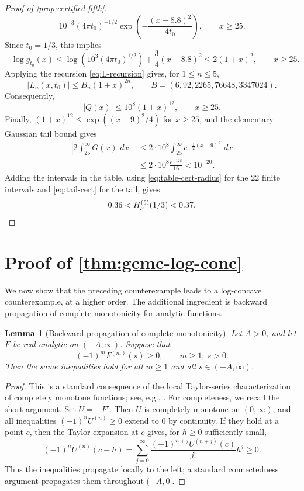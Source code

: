 \documentclass[11pt]{article}
\newtheorem{lemma}{Lemma}
\newcommand{\dd}{\,d}
\begin{document}
\begin{proof}[Proof of \cref{prop:certified-fifth}]
\[   10^{-3}(4\pi t_0)^{-1/2}
   \exp\left(-\frac{(x-8.8)^2}{4t_0}\right),
   \qquad x\ge25.
\]
Since \(t_0=1/3\), this implies
\[
   -\log g_{t_0}(x)
   \le
   \log\!\left(10^3(4\pi t_0)^{1/2}\right)
   +\frac34(x-8.8)^2
   \le 2(1+x)^2,
   \qquad x\ge25.
\]
Applying the recursion \eqref{eq:L-recursion} gives, for \(1\le n\le5\),
\[
   |L_n(x,t_0)|\le B_n(1+x)^{2n},
   \qquad
   B=(6,92,2265,76648,3347024).
\]
Consequently,
\[
   |Q(x)|\le 10^8(1+x)^{12},
   \qquad x\ge25.
\]
Finally, \((1+x)^{12}\le \exp((x-9)^2/4)\) for \(x\ge25\), and the elementary Gaussian tail bound gives
\begin{align}
   \left|2\int_{25}^{\infty}G(x)\,\dd x\right|
   &\le
   2\cdot10^8\int_{25}^{\infty}e^{-\frac12(x-9)^2}\,\dd x  \\
   &\le
   2\cdot10^8\frac{e^{-128}}{16}
   <10^{-20}. \label{eq:tail-cert}
\end{align}
Adding the intervals in the table, using \eqref{eq:table-cert-radius} for the \(22\) finite intervals and \eqref{eq:tail-cert} for the tail, gives
\[
   0.36
   <
   H_\mu^{(5)}(1/3)
   <
   0.37.
   \qedhere
\]
\end{proof}

\section{Proof of \texorpdfstring{\cref{thm:gcmc-log-conc}}{Theorem 2}} \label{sec:proof-thm-gcmc-log-conc}

We now show that the preceding counterexample leads to a log-concave counterexample, at a higher order. The additional ingredient is backward propagation of complete monotonicity for analytic functions.

\begin{lemma}[Backward propagation of complete monotonicity]\label{lem:backward}
Let \(A>0\), and let \(F\) be real analytic on \((-A,\infty)\). Suppose that
\[
   (-1)^mF^{(m)}(s)\ge0,\qquad m\ge1,\ s>0.
\]
Then the same inequalities hold for all \(m\ge1\) and all \(s\in(-A,\infty)\).
\end{lemma}

\begin{proof}
This is a standard consequence of the local Taylor-series characterization of
completely monotone functions; see, e.g., \cite{widder1941laplace,schilling2012bernstein}.
For completeness, we recall the short argument. Set \(U=-F'\). Then \(U\) is
completely monotone on \((0,\infty)\), and all inequalities
\((-1)^nU^{(n)}\ge0\) extend to \(0\) by continuity. If they hold at a point
\(c\), then the Taylor expansion at \(c\) gives, for \(h\ge0\) sufficiently small,
\[
   (-1)^nU^{(n)}(c-h)
   =
   \sum_{j=0}^{\infty}
   \frac{(-1)^{n+j}U^{(n+j)}(c)}{j!}h^j
   \ge0 .
\]
Thus the inequalities propagate locally to the left; a standard connectedness
argument propagates them throughout \((-A,0]\).
\end{proof}
\end{document}
